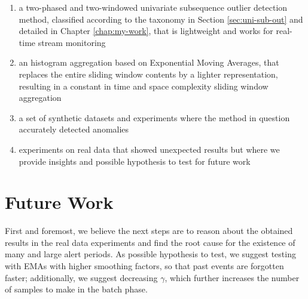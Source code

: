 \begin{enumerate}
    \item a two-phased and two-windowed univariate subsequence outlier detection method, classified according to the taxonomy in Section \ref{sec:uni-sub-out} and detailed in Chapter \ref{chap:my-work}, that is lightweight and works for real-time stream monitoring
    
    \item an histogram aggregation based on Exponential Moving Averages, that replaces the entire sliding window contents by a lighter representation, resulting in a constant in time and space complexity sliding window aggregation
    
    \item a set of synthetic datasets and experiments where the method in question accurately detected anomalies
    
    \item experiments on real data that showed unexpected results but where we provide insights and possible hypothesis to test for future work
\end{enumerate}

\section{Future Work}

First and foremost, we believe the next steps are to reason about the obtained results in the real data experiments and find the root cause for the existence of many and large alert periods. As possible hypothesis to test, we suggest testing with EMAs with higher smoothing factors, so that past events are forgotten faster; additionally, we suggest decreasing $\gamma$, which further increases the number of samples to make in the batch phase.

